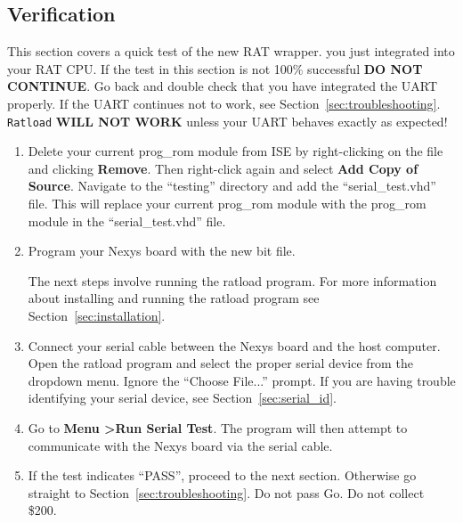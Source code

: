 \documentclass[notitlepage]{article}
\newcommand{\infosign}{\fontencoding{U}\fontfamily{futs}\huge\selectfont\char 116\relax}
\begin{document}
\subsection{Verification}
\label{sec:verification}
This section covers a quick test of the new RAT wrapper. you just integrated into your RAT CPU. If the test in this section is not 100\% successful \textbf{DO NOT CONTINUE}. Go back and double check that you have integrated the UART properly. If the UART continues not to work, see Section~\ref{sec:troubleshooting}. \texttt{Ratload} \textbf{WILL NOT WORK} unless your UART behaves exactly as expected!

\begin{enumerate}
\item Delete your current prog\_rom module from ISE by right-clicking on the file and clicking \textbf{Remove}. Then right-click again and select \textbf{Add Copy of Source}. Navigate to the ``testing'' directory and add the ``serial\_test.vhd'' file. This will replace your current prog\_rom module with the prog\_rom module in the ``serial\_test.vhd'' file.

\item Program your Nexys board with the new bit file.

\begin{infobox}
  {\infosign} The next steps involve running the ratload program. For more information about installing and running the ratload program see Section~\ref{sec:installation}.
\end{infobox}

\item Connect your serial cable between the Nexys board and the host computer. Open the ratload program and select the proper serial device from the dropdown menu. Ignore the ``Choose File...'' prompt. If you are having trouble identifying your serial device, see Section~\ref{sec:serial_id}.

\item Go to \textbf{Menu \textgreater Run Serial Test}. The program will then attempt to communicate with the Nexys board via the serial cable.

\item If the test indicates ``PASS'', proceed to the next section. Otherwise go straight to Section~\ref{sec:troubleshooting}. Do not pass Go. Do not collect \$200.
\end{enumerate}
\end{document}
